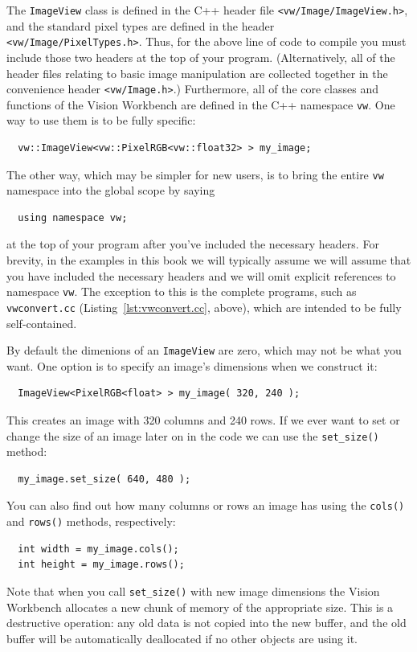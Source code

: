 The \verb#ImageView# class is defined in the C++ header file
\verb#<vw/Image/ImageView.h>#, and the standard pixel types are
defined in the header \verb#<vw/Image/PixelTypes.h>#.  Thus, for the
above line of code to compile you must include those two headers at
the top of your program.  (Alternatively, all of the header files
relating to basic image manipulation are collected together in the
convenience header \verb#<vw/Image.h>#.)  Furthermore, all of the core
classes and functions of the Vision Workbench are defined in the C++
namespace \verb#vw#.  One way to use them is to be fully specific:
\begin{verbatim}
  vw::ImageView<vw::PixelRGB<vw::float32> > my_image;
\end{verbatim}
The other way, which may be simpler for new users, is to bring the 
entire \verb#vw# namespace into the global scope by saying 
\begin{verbatim}
  using namespace vw;
\end{verbatim}
at the top of your program after you've included the necessary
headers.  For brevity, in the examples in this book we will typically 
assume we will assume that you have included the necessary headers 
and we will omit explicit references to namespace \verb#vw#.  The 
exception to this is the complete programs, such as \verb#vwconvert.cc# 
(Listing~\ref{lst:vwconvert.cc}, above), which are intended to be fully
self-contained.

By default the dimenions of an \verb#ImageView# are zero, which may not 
be what you want.  One option is to specify an image's dimensions when 
we construct it:
\begin{verbatim}
  ImageView<PixelRGB<float> > my_image( 320, 240 );
\end{verbatim}
This creates an image with 320 columns and 240 rows.  If we ever want to 
set or change the size of an image later on in the code we can use the 
\verb#set_size()# method:
\begin{verbatim}
  my_image.set_size( 640, 480 );
\end{verbatim}
You can also find out how many columns or rows an image has using the 
\verb#cols()# and \verb#rows()# methods, respectively:
\begin{verbatim}
  int width = my_image.cols();
  int height = my_image.rows();
\end{verbatim}
Note that when you call \verb#set_size()# with new image dimensions
the Vision Workbench allocates a new chunk of memory of the
appropriate size.  This is a destructive operation: any old data is
not copied into the new buffer, and the old buffer will be
automatically deallocated if no other objects are using it.

